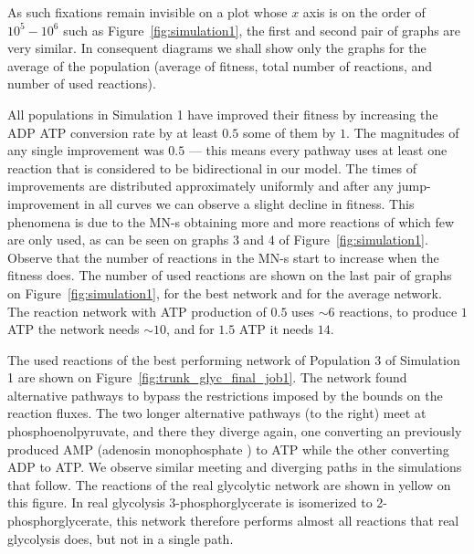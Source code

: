 \documentclass[a4paper,12pt]{article}
\begin{document}
As such fixations remain invisible on a plot whose $x$ axis is on the order of $10^5-10^6$ such as Figure~\ref{fig:simulation1}, the first and second pair of graphs are very similar. In consequent diagrams we shall show only the graphs for the average of the population (average of fitness, total number of reactions, and number of used reactions).

All populations in Simulation 1 have improved their fitness by increasing the ADP ATP conversion rate by at least $0.5$ some of them by $1$. The magnitudes of any single improvement was $0.5$ --- this means every pathway uses at least one reaction that is considered to be bidirectional in our model. The times of improvements are distributed approximately uniformly and after any jump-improvement in all curves we can observe a slight decline in fitness. This phenomena is due to the MN-s obtaining more and more reactions of which few are only used, as can be seen on graphs 3 and 4 of Figure~\ref{fig:simulation1}. Observe that the number of reactions in the MN-s start to increase when the fitness does. The number of used reactions are shown on the last pair of graphs on Figure~\ref{fig:simulation1}, for the best network and for the average network. The reaction network with ATP production of $0.5$ uses $\sim 6$ reactions, to produce $1$ ATP the network needs $\sim 10$, and for $1.5$ ATP it needs $14$. 

The used reactions of the best performing network of Population 3 of Simulation 1 are shown on Figure~\ref{fig:trunk_glyc_final_job1}. The network found alternative pathways to bypass the restrictions imposed by the bounds on the reaction fluxes. The two longer alternative pathways (to the right) meet at phosphoenolpyruvate, and there they diverge again, one converting an previously produced AMP (adenosin monophosphate ) to ATP while the other converting ADP to ATP. We observe similar meeting and diverging paths in the simulations that follow. The reactions of the real glycolytic network are shown in yellow on this figure. In real glycolysis 3-phosphorglycerate is isomerized to 2-phosphorglycerate, this network therefore performs almost all reactions that real glycolysis does, but not in a single path. 
\end{document}
